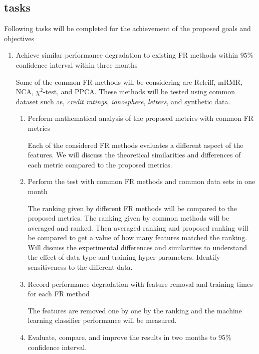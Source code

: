 \subsection{tasks}
Following tasks will be completed for the achievement of the proposed goals and objectives

\begin{enumerate}
    \item Achieve similar performance degradation to existing FR methods within $95\%$ confidence interval within three months
    
    Some of the common FR methods will be considering are Releiff\cite{Kononenko1997}, mRMR\cite{Ding2005}, NCA\cite{Goldberger2005}, $\chi^2$-test, and PPCA\cite{Tipping1999}. These methods will be tested using common dataset such as, \textit{credit ratings}, \textit{ionosphere}, \textit{letters}, and synthetic data.    
    
    
    \begin{enumerate}
        \item Perform mathematical analysis of the proposed metrics with common FR metrics
        
        Each of the considered FR methods evaluates a different aspect of the features. We will discuss the theoretical similarities and differences of each metric compared to the proposed metrics.
        
        \item Perform the test with common FR methods and common data sets in one month
        
        The ranking given by different FR methods will be compared to the proposed metrics. The ranking given by common methods will be averaged and ranked. Then averaged ranking and proposed ranking will be compared to get a value of how many features matched the ranking.  Will discuss the experimental differences and similarities to understand the effect of data type and training hyper-parameters. Identify sensitiveness to the different data.
        
        \item Record performance degradation with feature removal and training times for each FR method
        
        The features are removed one by one by the ranking and the machine learning classifier performance will be measured. 
        
        \item Evaluate, compare, and improve the results in two months to $95\%$ confidence interval.
        

\end{enumerate}
\end{enumerate}
